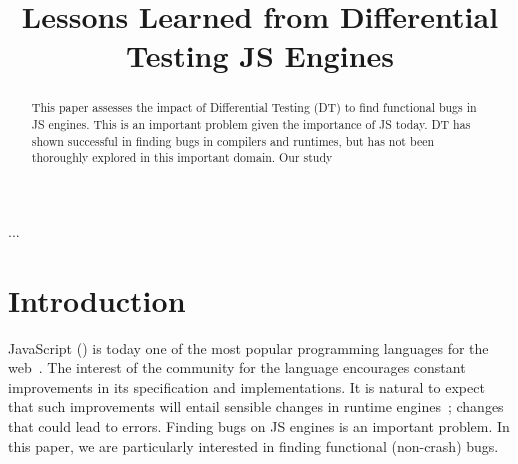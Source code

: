 \documentclass[10pt,conference,anonymous]{IEEEtran}
\begin{document}
\title{Lessons Learned from Differential Testing JS Engines}


\maketitle

\thispagestyle{plain}
\pagestyle{plain}

\begin{abstract}
This paper assesses the impact of Differential Testing (DT) to find
functional bugs in JS engines. This is an important problem given the
importance of JS today. DT has shown successful in finding bugs in
compilers and runtimes, but has not been thoroughly explored in this
important domain. Our study 
\end{abstract}

\begin{IEEEkeywords}
...
\end{IEEEkeywords}

\section{Introduction}

JavaScript (\js{}) is today one of the most popular programming
languages for the web~\cite{business-insider,stackify}. The interest
of the community for the language encourages constant improvements in
its specification and implementations. It is natural to expect that
such improvements will entail sensible changes in runtime
engines~\cite{kangax}; changes that could lead to errors. Finding bugs
on JS engines is an important problem. In this paper, we are
particularly interested in finding functional (non-crash) bugs.
\end{document}
